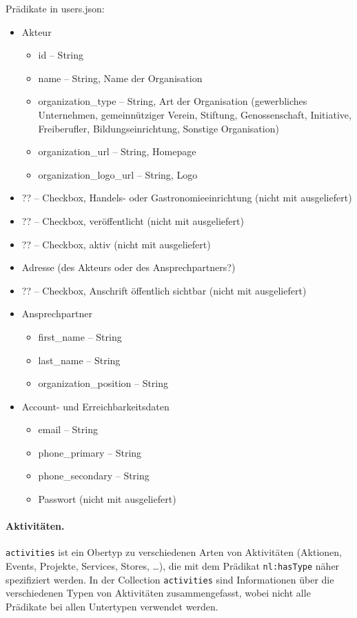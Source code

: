 \documentclass[a4paper,11pt]{article}
\begin{document}
Prädikate in users.json:
\begin{itemize}\itemsep0pt
\item Akteur
\begin{itemize}\itemsep0pt
  \item id -- String
  \item name -- String, Name der Organisation
  \item organization\_type -- String, Art der Organisation (gewerbliches
    Unternehmen, gemeinnütziger Verein, Stiftung, Genossenschaft, Initiative,
    Freiberufler, Bildungseinrichtung, Sonstige Organisation)
  \item organization\_url -- String, Homepage
  \item organization\_logo\_url -- String, Logo
\end{itemize}
\item ?? -- Checkbox, Handels- oder Gastronomieeinrichtung (nicht mit
  ausgeliefert)
\item ?? -- Checkbox, veröffentlicht (nicht mit ausgeliefert)
\item ?? -- Checkbox, aktiv (nicht mit ausgeliefert)
\item Adresse (des Akteurs oder des Ansprechpartners?)
\item ?? -- Checkbox, Anschrift öffentlich sichtbar (nicht mit ausgeliefert)
\item Ansprechpartner
\begin{itemize}\itemsep0pt
  \item first\_name -- String
  \item last\_name -- String
  \item organization\_position -- String
\end{itemize}
\item Account- und Erreichbarkeitsdaten
\begin{itemize}\itemsep0pt
  \item email -- String
  \item phone\_primary -- String
  \item phone\_secondary -- String
  \item Passwort (nicht mit ausgeliefert)
\end{itemize}
\end{itemize}

\paragraph{Aktivitäten.}
\texttt{activities} ist ein Obertyp zu verschiedenen Arten von Aktivitäten
(Aktionen, Events, Projekte, Services, Stores, \ldots), die mit dem Prädikat
\texttt{nl:hasType} näher spezifiziert werden.  In der Collection
\texttt{activities} sind Informationen über die verschiedenen Typen von
Aktivitäten zusammengefasst, wobei nicht alle Prädikate bei allen Untertypen
verwendet werden. 
\end{document}
